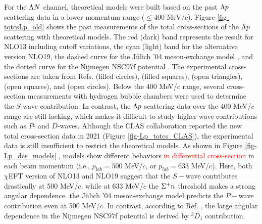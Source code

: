 For the $\Lambda N$ channel, theoretical models were built based on the past $\Lambda p$ scattering data in a lower momentum range ($\leq400$ MeV/$c$). Figure \ref{fig-totcsLp_old} \cite{chiEFT-2020} shows the past measurements of the total cross-sections of the $\Lambda p$ scattering with theoretical models. The red (dark) band represents the result for NLO13 \cite{NLO13} including cutoff variations, the cyan (light) band for the alternative version NLO19, the dashed curve for the J\"{u}lich '04 meson-exchange model \cite{Julich04}, and the dotted curve for the Nijmegen NSC97f potential \cite{NSC97f}. The experimental cross-sections are taken from Refs. \cite{Lp-1968_Sechi} (filled circles), \cite{Lp-1968_Alex} (filled squares), \cite{Lp-1967_Herndon} (open triangles), \cite{Lp-1971} (open squares), and \cite{Lp-1977_Hauptman} (open circles). Below the $400$ MeV/$c$ range, several cross-section measurements with hydrogen bubble chambers were used to determine the $S$-wave contribution. In contrast, the $\Lambda p$ scattering data over the $400$ MeV/$c$ range are still lacking, which makes it difficult to study higher wave contributions such as $P$- and $D$-waves. Although the CLAS collaboration reported the new total cross-section data \cite{Lp-2021} in 2021 (Figure \ref{fig-Lp_totcs_CLAS}), the experimental data is still insufficient to restrict the theoretical models. As shown in Figure \ref{fig-Lp_dcs_models} \cite{chiEFT-2020}, models show different behaviors \textcolor{red}{in differential cross-section} in each beam momentum (i.e., $p_{lab}=500$ MeV/$c$, or $p_{lab}=633$ MeV/$c$). Here, both $\chi$EFT version of NLO13 and NLO19 suggest that the $S-$wave contributes drastically at 500 MeV/$c$, while at 633 MeV/$c$ the $\Sigma^{+}n$ threshold makes a strong angular dependence. the J\"{u}lich '04 meson-exchange model predicts the $P-$wave contribution even at 500 MeV/$c$. In contrast, according to Ref. \cite{OBE-1999}, the large angular dependence in the Nijmegen NSC97f potential is derived by $^3D_1$ contribution. 




